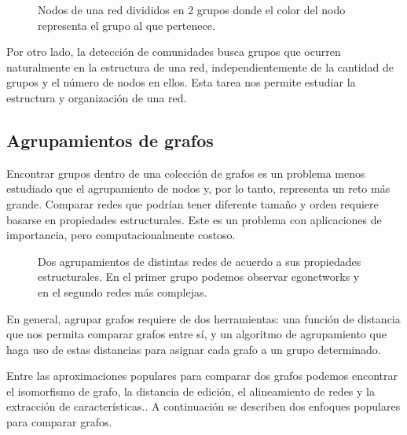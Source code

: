 \begin{figure}[htbp]
   \centering
   
    \caption{Nodos de una red divididos en 2 grupos donde el color del nodo representa el grupo al que pertenece.}
    \label{fig:partition}
\end{figure}

Por otro lado, la detección de comunidades busca grupos que ocurren naturalmente en la estructura de una red, independientemente de la cantidad de grupos y el número de nodos en ellos. Esta tarea nos permite estudiar la estructura y organización de una red. 

\subsection{Agrupamientos de grafos}
Encontrar grupos dentro de una colección de grafos es un problema menos estudiado que el agrupamiento de nodos y, por lo tanto, representa un reto más grande. Comparar redes que podrían tener diferente tamaño y orden requiere basarse en propiedades estructurales. Este es un problema con aplicaciones de importancia, pero computacionalmente costoso. 

 \begin{figure}[htbp]
   \centering
   
    \caption{Dos agrupamientos de distintas redes de acuerdo a sus propiedades estructurales. En el primer grupo podemos observar egonetworks y en el segundo redes más complejas. }
    \label{fig:netcluster}
\end{figure}

En general, agrupar grafos requiere de dos herramientas: una función de distancia que nos permita comparar grafos entre sí, y un algoritmo de agrupamiento que haga uso de estas distancias para asignar cada grafo a un grupo determinado. 

Entre las aproximaciones populares para comparar dos grafos podemos encontrar el isomorfismo de grafo, la distancia de edición, el alineamiento de redes y la extracción de características.\cite{saxena_identifying_2019}. A continuación se describen dos enfoques populares para comparar grafos. 


